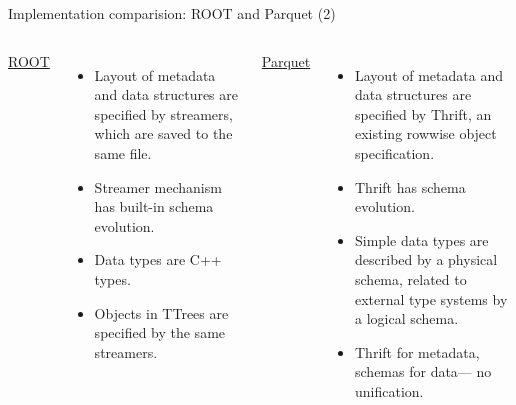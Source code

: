 \documentclass[aspectratio=169]{beamer}
\begin{document}
\begin{frame}{Implementation comparision: ROOT and Parquet (2)}
\vspace{0.5 cm}
\begin{columns}[t]
{\large \underline{ROOT}}

\begin{itemize}
\item Layout of metadata and data structures are specified by streamers, which are saved to the same file.

\item Streamer mechanism has built-in schema evolution.

\item Data types are C++ types. \mbox{\hspace{5 cm}} \mbox{\hspace{5 cm}}

\item Objects in TTrees are specified by the same streamers.
\end{itemize}

{\large \underline{Parquet}}

\begin{itemize}
\item Layout of metadata and data structures are specified by Thrift, an existing rowwise object specification.

\item Thrift has schema evolution. \mbox{\hspace{5 cm}}

\item Simple data types are described by a physical schema, related to external type systems by a logical schema.

\item Thrift for metadata, schemas for data--- no unification.
\end{itemize}
\end{columns}
\end{frame}
\end{document}
